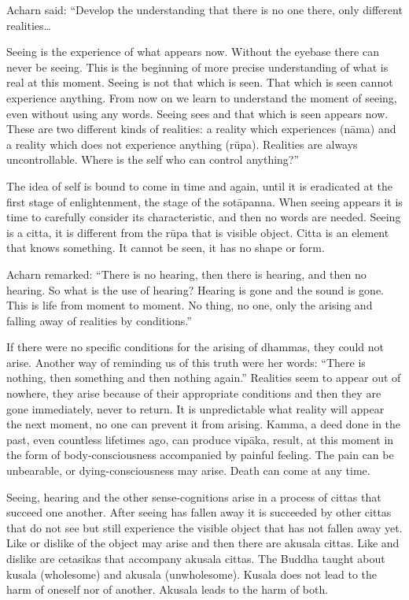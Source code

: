 {{Acharn said: ``Develop the
understanding that there is no one there, only different
realities\ldots{ Seeing is the experience of what appears now. Without
the eyebase there can never be seeing. This is the beginning of more
precise understanding of what is real at this moment. Seeing is not that
which is seen. That which is seen cannot experience anything. From now
on we learn to understand the moment of seeing, even without using any
words. Seeing sees and that which is seen appears now. These are two
different kinds of realities: a reality which experiences (nāma) and a
reality which does not experience anything (rūpa). Realities are always
uncontrollable. Where is the self who can control anything?''

The idea of self is bound to come in
time and again, until it is eradicated at the first stage of
enlightenment, the stage of the sotāpanna. When seeing appears it is
time to carefully consider its characteristic, and then no words are
needed. Seeing is a citta, it is different from the rūpa that is visible
object. Citta is an element that knows something. It cannot be seen, it
has no shape or form. 

Acharn remarked: ``There is no hearing,
then there is hearing, and then no hearing. So what is the use of
hearing? Hearing is gone and the sound is gone. This is life from moment
to moment. No thing, no one, only the arising and falling away of
realities by conditions.''

If there were no specific conditions
for the arising of dhammas, they could not arise. Another way of
reminding us of this truth were her words: ``There is nothing, then
something and then nothing again.'' Realities seem to appear out of
nowhere, they arise because of their appropriate conditions and then
they are gone immediately, never to return. It is unpredictable what
reality will appear the next moment, no one can prevent it from arising.
Kamma, a deed done in the past, even countless lifetimes ago, can
produce vipāka, result, at this moment in the form of body-consciousness
accompanied by painful feeling. The pain can be unbearable, or
dying-consciousness may arise. Death can come at any time. 

Seeing, hearing and the other
sense-cognitions arise in a process of cittas that succeed one another.
After seeing has fallen away it is succeeded by other cittas that do not
see but still experience the visible object that has not fallen away
yet. Like or dislike of the object may arise and then there are akusala
cittas. Like and dislike are cetasikas that accompany akusala cittas.
The Buddha taught about kusala (wholesome) and akusala (unwholesome).
Kusala does not lead to the harm of oneself nor of another. Akusala
leads to the harm of both. 

}}}
